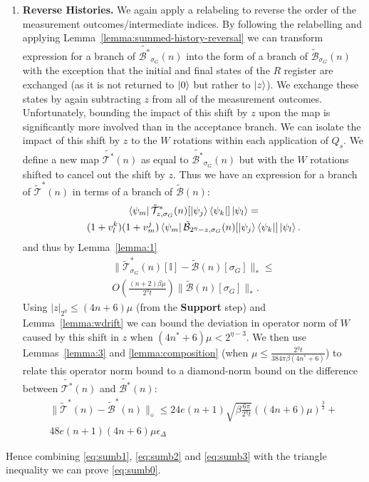 \documentclass[aps,floatfix,10pt,amssymb,amsfont,amsmath,superscriptaddress,float,nofootinbib,longbibliography,nobalancelastpage,twocolumn]{revtex4-2}
\begin{document}
\begin{enumerate}
\item \textbf{Reverse Histories.} We again apply a relabeling to reverse the order of the measurement outcomes/intermediate indices. By following the relabelling and applying Lemma~\ref{lemma:summed-history-reversal} we can transform expression for a branch of $\tilde{\mathcal{B^*}}_{\sigma_G}(n)$ into the form of a branch of $\tilde{\mathcal{B}}_{\sigma_G}(n)$ with the exception that the initial and final states of the $R$ register are exchanged (as it is not returned to $\ket{0}$ but rather to $\ket{z}$). We exchange these states by again subtracting $z$ from all of the measurement outcomes. Unfortunately, bounding the impact of this shift by $z$ upon the map is significantly more involved than in the acceptance branch. We can isolate the impact of this shift by $z$ to the $W$ rotations within each application of $Q_s$. We define a new map $\tilde{\mathcal{T}^*}(n)$ as equal to $\tilde{\mathcal{B^*}}_{\sigma_G}(n)$ but with the $W$ rotations shifted to cancel out the shift by $z$. Thus we have an expression for a branch of $\tilde{\mathcal{T}}^*(n)$ in terms of a branch of $\tilde{\mathcal{B}}(n)$:
\begin{multline}
    \bra{\psi_m}\tilde{\mathcal{T}}^*_{z,\sigma_G}(n)[\ket{\psi_j}\bra{\psi_k}]\ket{\psi_l}
    =\\(1+v_l^k)(1+v_m^j)\bra{\psi_m}\tilde{\mathcal{B}}_{2^{\eta}-z,\sigma_G}(n)[\ket{\psi_j}\bra{\psi_k}]\ket{\psi_l}.
\end{multline}
and thus by Lemma~\ref{lemma:1}
\begin{multline}
    \|\tilde{\mathcal{T}}^*_{\sigma_G}(n)[\mathbb{I}] - \tilde{\mathcal{B}}(n)[\sigma_G]\|_* \leq \\O\left(\frac{(n+2)\beta \mu}{2^{\eta}t}\right)\|\tilde{\mathcal{B}}(n)[\sigma_G]\|_*.
    \label{eq:sumb2}
\end{multline}
Using $|z|_{2^{\eta}} \leq (4n+6)\mu$ (from the \textbf{Support} step) and Lemma~\ref{lemma:wdrift} we can bound the deviation in operator norm of $W$ caused by this shift in $z$ when $(4n^*+6)\mu < 2^{\eta-3}$. We then use Lemmas~\ref{lemma:3} and \ref{lemma:composition} (when $\mu \leq \frac{2^{\eta}t}{384\pi\beta(4n^*+6)}$) to relate this operator norm bound to a diamond-norm bound on the difference between $\tilde{\mathcal{T}^*}(n)$ and $\tilde{\mathcal{B}^*}(n)$:
\begin{multline}
    \|\tilde{\mathcal{T}}^*(n) - \tilde{\mathcal{B}}^*(n)\|_{\diamond} \leq 24e(n+1)\sqrt{\beta\frac{6\pi}{2^{\eta}t}}((4n+6)\mu)^{\frac{3}{2}}+\\48e(n+1)(4n+6)\mu\epsilon_{\Delta}
    \label{eq:sumb3}
\end{multline}
\end{enumerate}
Hence combining \eqref{eq:sumb1}, \eqref{eq:sumb2} and \eqref{eq:sumb3} with the triangle inequality we can prove \eqref{eq:sumb0}.
\end{document}
